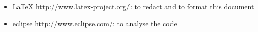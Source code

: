 \begin{itemize}
	\item LaTeX \url{http://www.latex-project.org/}: to redact and to format this document
	\item eclipse \url{http://www.eclipse.com/}: to analyse the code
\end{itemize}